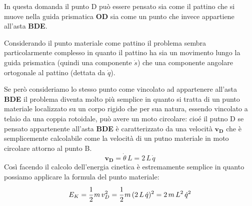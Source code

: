 In questa domanda il punto D può essere pensato sia come il pattino che si muove nella guida prismatica \textbf{OD} sia come un punto che invece appartiene all'asta \textbf{BDE}.

Considerando il punto materiale come pattino il problema sembra particolarmente complesso in quanto il pattino ha sia un movimento lungo la guida prismatica (quindi una componente $\dot{s}$) che una componente angolare ortogonale al pattino (dettata da $\dot{q}$).

Se però consideriamo lo stesso punto come vincolato ad appartenere all'asta \textbf{BDE} il problema diventa molto più semplice in quanto si tratta di un punto materiale localizzato su un corpo rigido che per sua natura, essendo vincolato a telaio da una coppia rotoidale, può avere un moto circolare: cioé il putno D se pensato appartenente all'asta \textbf{BDE} è caratterizzato da una velocità $\mathbf{v_D}$ che è semplicemente calcolabile come la velocità di un putno materiale in moto circolare attorno al punto B.
\[\mathbf{v_D} = \dot{\theta}\,L = 2\,L\,\dot{q}\]
Così facendo il calcolo dell'energia cinetica è estremamente semplice in quanto possiamo applicare la formula del punto materiale:
\[E_K = \cfrac{1}{2}\,m\,v_D^2 = \cfrac{1}{2}\,m\,(2\,L\,\dot{q})^2 = 2\,m\,L^2\,\dot{q}^2\]
